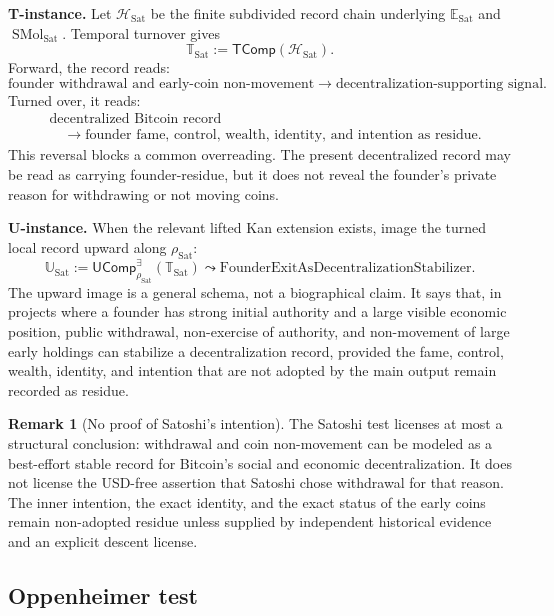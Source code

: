 \documentclass[11pt]{article}
\newcommand{\defeq}{\mathrel{:=}}
\newcommand{\TComp}{\mathsf{TComp}}
\newcommand{\UComp}{\mathsf{UComp}}
\theoremstyle{definition}
\newtheorem{remark}[definition]{Remark}
\theoremstyle{plain}
\begin{document}
\textbf{T-instance.}  Let $\mathcal H_{\mathrm{Sat}}$ be the finite subdivided
record chain underlying $\mathbb E_{\mathrm{Sat}}$ and
$\operatorname{SMol}_{\mathrm{Sat}}$.  Temporal turnover gives
\[
  \mathbb T_{\mathrm{Sat}}
  \defeq
  \TComp(\mathcal H_{\mathrm{Sat}}).
\]
Forward, the record reads:
\[
  \text{founder withdrawal and early-coin non-movement}
  \longrightarrow
  \text{decentralization-supporting signal}.
\]
Turned over, it reads:
\[
\begin{aligned}
  &\text{decentralized Bitcoin record}\\
  &\quad\longrightarrow
  \text{founder fame, control, wealth, identity, and intention as residue}.
\end{aligned}
\]
This reversal blocks a common overreading.  The present decentralized
record may be read as carrying founder-residue, but it does not reveal
the founder's private reason for withdrawing or not moving coins.

\textbf{U-instance.}  When the relevant lifted Kan extension exists,
image the turned local record upward along $\rho_{\mathrm{Sat}}$:
\[
  \mathbb U_{\mathrm{Sat}}
  \defeq
  \UComp^{\exists}_{\rho_{\mathrm{Sat}}}(\mathbb T_{\mathrm{Sat}})
  \leadsto
  \mathrm{FounderExitAsDecentralizationStabilizer}.
\]
The upward image is a general schema, not a biographical claim.  It says
that, in projects where a founder has strong initial authority and a large
visible economic position, public withdrawal, non-exercise of authority,
and non-movement of large early holdings can stabilize a decentralization
record, provided the fame, control, wealth, identity, and intention that
are not adopted by the main output remain recorded as residue.

\begin{remark}[No proof of Satoshi's intention]
The Satoshi test licenses at most a structural conclusion: withdrawal and
coin non-movement can be modeled as a best-effort stable record for
Bitcoin's social and economic decentralization.  It does not license the
USD-free assertion that Satoshi chose withdrawal for that reason.  The
inner intention, the exact identity, and the exact status of the early
coins remain non-adopted residue unless supplied by independent historical
evidence and an explicit descent license.
\end{remark}

\subsection{Oppenheimer test}
\end{document}
